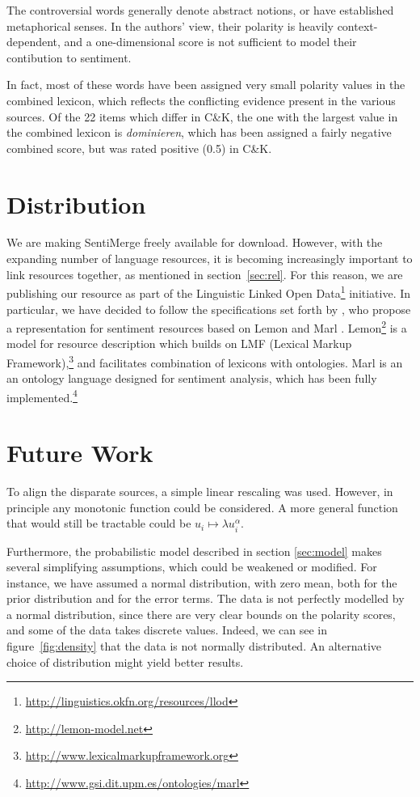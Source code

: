 \documentclass[11pt]{article}
\begin{document}
The controversial words generally denote abstract notions, or have established metaphorical senses. In the authors' view, their polarity is heavily context-dependent, and a one-dimensional score is not sufficient to model their contibution to sentiment.

In fact, most of these words have been assigned very small polarity values in the combined lexicon, which reflects the conflicting evidence present in the various sources. Of the 22 items which differ in C\&K, the one with the largest value in the combined lexicon is \emph{dominieren}, which has been assigned a fairly negative combined score, but was rated positive (0.5) in C\&K.


\section{Distribution} \label{sec:dist}

We are making SentiMerge freely available for download.  However, with the expanding number of language resources, it is becoming increasingly important to link resources together, as mentioned in section~\ref{sec:rel}.  For this reason, we are publishing our resource as part of the Linguistic Linked Open Data\footnote{\url{http://linguistics.okfn.org/resources/llod}} initiative.  In particular, we have decided to follow the specifications set forth by , who propose a representation for sentiment resources based on Lemon \cite{mccraeJ2011lemon} and Marl \cite{westerski2011marl}.  Lemon\footnote{\url{http://lemon-model.net}} is a model for resource description which builds on LMF (Lexical Markup Framework),\footnote{\url{http://www.lexicalmarkupframework.org}} and facilitates combination of lexicons with ontologies.  Marl is an an ontology language designed for sentiment analysis, which has been fully implemented.\footnote{\url{http://www.gsi.dit.upm.es/ontologies/marl}}


\section{Future Work} \label{sec:future}

To align the disparate sources, a simple linear rescaling was used.  However, in principle any monotonic function could be considered.  A more general function that would still be tractable could be $u_i \mapsto \lambda u_i^\alpha$.

Furthermore, the probabilistic model described in section \ref{sec:model} makes several simplifying assumptions, which could be weakened or modified. For instance, we have assumed a normal distribution, with zero mean, both for the prior distribution and for the error terms. The data is not perfectly modelled by a normal distribution, since there are very clear bounds on the polarity scores, and some of the data takes discrete values.  Indeed, we can see in figure~\ref{fig:density} that the data is not normally distributed. An alternative choice of distribution might yield better results.
\end{document}
